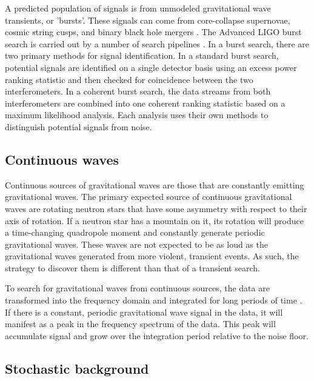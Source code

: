 A predicted population of signals is from unmodeled gravitational 
wave transients, or 'bursts'. These signals can come from core-collapse 
supernovae, cosmic string cusps, and binary black hole mergers 
\cite{Damour:2004kw,GW150914-BURST,lrr-2011-1}. The Advanced LIGO burst 
search is carried out by a number of search pipelines 
\cite{Lynch:2015,BayesWave,Klimenko:2007hd}. 
In a burst search, there are two primary methods for signal identification. 
In a standard burst search, potential signals are identified on a single detector 
basis using an excess power ranking statistic and then checked for coincidence 
between the two interferometers. In a coherent burst search, the data streams 
from both interferometers are combined into one coherent ranking statistic based 
on a maximum likelihood analysis. Each analysis uses their own methods to 
distinguish potential signals from noise.

\subsection{Continuous waves}

Continuous sources of gravitational waves are those that are constantly emitting 
gravitational waves. The primary expected source of continuous gravitational 
waves are rotating neutron stars that have some asymmetry with respect to their 
axis of rotation. If a neutron star has a mountain on it, its rotation will 
produce a time-changing quadropole moment and constantly generate periodic 
gravitational waves. These waves are not expected to be as loud as the 
gravitational waves generated from more violent, transient events. As such, 
the strategy to discover them is different than that of a transient search.

To search for gravitational waves from continuous sources, the data are 
transformed into the frequency domain and integrated for long periods of 
time \cite{CW-all-sky,EinsteinHome}. 
If there is a constant, periodic gravitational wave signal in the data, it 
will manifest as a peak in the frequency spectrum of the data. This peak will 
accumulate signal and grow over the integration period relative to the 
noise floor. 

\subsection{Stochastic background}

